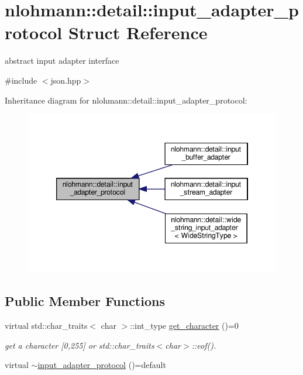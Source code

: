 \hypertarget{structnlohmann_1_1detail_1_1input__adapter__protocol}{}\section{nlohmann\+:\+:detail\+:\+:input\+\_\+adapter\+\_\+protocol Struct Reference}
\label{structnlohmann_1_1detail_1_1input__adapter__protocol}


abstract input adapter interface  




{\ttfamily \#include $<$json.\+hpp$>$}



Inheritance diagram for nlohmann\+:\+:detail\+:\+:input\+\_\+adapter\+\_\+protocol\+:
\nopagebreak
\begin{figure}[H]
\begin{center}
\leavevmode
\includegraphics[width=346pt]{structnlohmann_1_1detail_1_1input__adapter__protocol__inherit__graph}
\end{center}
\end{figure}
\subsection*{Public Member Functions}
\begin{DoxyCompactItemize}
\item 
virtual std\+::char\+\_\+traits$<$ char $>$\+::int\+\_\+type \hyperlink{structnlohmann_1_1detail_1_1input__adapter__protocol_aac10a6a4048a8ce8e2ed50277692a3ca}{get\+\_\+character} ()=0
\begin{DoxyCompactList}\small\item\em get a character \mbox{[}0,255\mbox{]} or std\+::char\+\_\+traits$<$char$>$\+::eof(). \end{DoxyCompactList}\item 
virtual \hyperlink{structnlohmann_1_1detail_1_1input__adapter__protocol_a92dac74def4ac5adacd0684088bd4082}{$\sim$input\+\_\+adapter\+\_\+protocol} ()=default
\end{DoxyCompactItemize}


